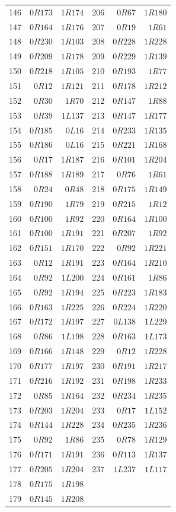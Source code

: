 \begin{center}
\begin{tabular}{@{}rrr@{\hspace{0.75in}}rrr@{}}
146 & $0R173$ & $1R174$ & 206 & $0R67$ & $1R180$\\
147 & $0R164$ & $1R176$ & 207 & $0R19$ & $1R61$\\
148 & $0R230$ & $1R103$ & 208 & $0R228$ & $1R228$\\
149 & $0R209$ & $1R178$ & 209 & $0R229$ & $1R139$\\
150 & $0R218$ & $1R105$ & 210 & $0R193$ & $1R77$\\
151 & $0R12$ & $1R121$ & 211 & $0R178$ & $1R212$\\
152 & $0R30$ & $1R70$ & 212 & $0R147$ & $1R88$\\
153 & $0R39$ & $1L137$ & 213 & $0R147$ & $1R177$\\
154 & $0R185$ & $0L16$ & 214 & $0R233$ & $1R135$\\
155 & $0R186$ & $0L16$ & 215 & $0R221$ & $1R168$\\
156 & $0R17$ & $1R187$ & 216 & $0R101$ & $1R204$\\
157 & $0R188$ & $1R189$ & 217 & $0R76$ & $1R61$\\
158 & $0R24$ & $0R48$ & 218 & $0R175$ & $1R149$\\
159 & $0R190$ & $1R79$ & 219 & $0R215$ & $1R12$\\
160 & $0R100$ & $1R92$ & 220 & $0R164$ & $1R100$\\
161 & $0R100$ & $1R191$ & 221 & $0R207$ & $1R92$\\
162 & $0R151$ & $1R170$ & 222 & $0R92$ & $1R221$\\
163 & $0R12$ & $1R191$ & 223 & $0R164$ & $1R210$\\
164 & $0R92$ & $1L200$ & 224 & $0R161$ & $1R86$\\
165 & $0R92$ & $1R194$ & 225 & $0R223$ & $1R183$\\
166 & $0R163$ & $1R225$ & 226 & $0R224$ & $1R220$\\
167 & $0R172$ & $1R197$ & 227 & $0L138$ & $1L229$\\
168 & $0R86$ & $1L198$ & 228 & $0R163$ & $1L173$\\
169 & $0R166$ & $1R148$ & 229 & $0R12$ & $1R228$\\
170 & $0R177$ & $1R197$ & 230 & $0R191$ & $1R217$\\
171 & $0R216$ & $1R192$ & 231 & $0R198$ & $1R233$\\
172 & $0R85$ & $1R164$ & 232 & $0R234$ & $1R235$\\
173 & $0R203$ & $1R204$ & 233 & $0R17$ & $1L152$\\
174 & $0R144$ & $1R228$ & 234 & $0R235$ & $1R236$\\
175 & $0R92$ & $1R86$ & 235 & $0R78$ & $1R129$\\
176 & $0R171$ & $1R191$ & 236 & $0R113$ & $1R137$\\
177 & $0R205$ & $1R204$ & 237 & $1L237$ & $1L117$\\
178 & $0R175$ & $1R198$ & & & \\
179 & $0R145$ & $1R208$ & & & \\
\bottomrule
\end{tabular}
\end{center}
\endgroup
\clearpage
